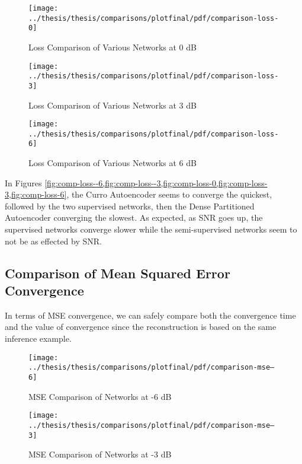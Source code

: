 \begin{figure}[!ht]
\centering
\texttt{[image: ../thesis/thesis/comparisons/plotfinal/pdf/comparison-loss-0]}
\caption{Loss Comparison of Various Networks at 0 dB}\label{fig:comp-loss-0}
\end{figure}

\begin{figure}[!ht]
\centering
\texttt{[image: ../thesis/thesis/comparisons/plotfinal/pdf/comparison-loss-3]}
\caption{Loss Comparison of Various Networks at 3 dB}\label{fig:comp-loss-3}
\end{figure}

\begin{figure}[!ht]
\centering
\texttt{[image: ../thesis/thesis/comparisons/plotfinal/pdf/comparison-loss-6]}
\caption{Loss Comparison of Various Networks at 6 dB}\label{fig:comp-loss-6}
\end{figure}

In Figures \cref{fig:comp-loss--6,fig:comp-loss--3,fig:comp-loss-0,fig:comp-loss-3,fig:comp-loss-6}, the Curro Autoencoder seems to converge the quickest, followed by the two supervised networks, then the Dense Partitioned Autoencoder converging the slowest. As expected, as SNR goes up, the supervised networks converge slower while the semi-supervised networks seem to not be as effected by SNR.


\subsection{Comparison of Mean Squared Error Convergence}

In terms of MSE convergence, we can safely compare both the convergence time and the value of convergence since the reconstruction is based on the same inference example.

\begin{figure}[!ht]
\centering
\texttt{[image: ../thesis/thesis/comparisons/plotfinal/pdf/comparison-mse--6]}
\caption{MSE Comparison of Networks at -6 dB}\label{fig:comp-mse--6}
\end{figure}

\begin{figure}[!ht]
\centering
\texttt{[image: ../thesis/thesis/comparisons/plotfinal/pdf/comparison-mse--3]}
\caption{MSE Comparison of Networks at -3 dB}\label{fig:comp-mse--3}
\end{figure}

